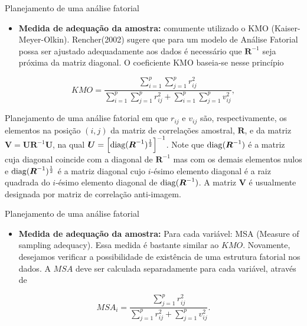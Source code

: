 \documentclass[
  ignorenonframetext,
  aspectratio=169,
]{beamer}
\providecommand{\tightlist}{%
  \setlength{\itemsep}{0pt}\setlength{\parskip}{0pt}}
\begin{document}
\begin{frame}{Planejamento de uma análise fatorial}
\label{planejamento-de-uma-anuxe1lise-fatorial-6}
\begin{itemize}
\tightlist
\item
  \textbf{Medida de adequação da amostra:} comumente utilizado o KMO
  (Kaiser-Meyer-Olkin). Rencher(2002) sugere que para um modelo de
  Análise Fatorial possa ser ajustado adequadamente aos dados é
  necessário que \(\boldsymbol{R}^{-1}\) seja próxima da matriz
  diagonal. O coeficiente KMO baseia-se nesse princípio
\end{itemize}

\[KMO = \dfrac{\displaystyle{\sum_{i=1}^p}\displaystyle{\sum_{j=1}^p} r^2_{ij}}{\displaystyle{\sum_{i=1}^p}\displaystyle{\sum_{j=1}^p} r_{ij}^2 + \displaystyle{\sum_{i=1}^p}\displaystyle{\sum_{j=1}^p}v_{ij}^2},\]
\end{frame}

\begin{frame}{Planejamento de uma análise fatorial}
\label{planejamento-de-uma-anuxe1lise-fatorial-7}
em que \(r_{ij}\) e \(v_{ij}\) são, respectivamente, os elementos na
posição \((i,j)\) da matriz de correlações amostral, \(\boldsymbol{R}\),
e da matriz
\(\boldsymbol{V} = \boldsymbol{U} \boldsymbol{R}^{-1} \boldsymbol{U}\),
na qual
\(\boldsymbol{U} = \left[{\rm diag} (\boldsymbol{R}^{-1})^{\frac{1}{2}}\right]^{-1}\).
Note que \({\rm diag}(\boldsymbol{R}^{-1})\) é a matriz cuja diagonal
coincide com a diagonal de \(\boldsymbol{R}^{-1}\) mas com os demais
elementos nulos e \({\rm diag}(\boldsymbol{R}^{-1})^{\frac{1}{2}}\) é a
matriz diagonal cujo \(i\)-ésimo elemento diagonal é a raiz quadrada do
\(i\)-ésimo elemento diagonal de \({\rm diag}(\boldsymbol{R}^{-1})\). A
matriz \(\boldsymbol{V}\) é usualmente designada por matriz de
correlação anti-imagem.
\end{frame}

\begin{frame}{Planejamento de uma análise fatorial}
\label{planejamento-de-uma-anuxe1lise-fatorial-8}
\begin{itemize}
\tightlist
\item
  \textbf{Medida de adequação da amostra:} Para cada variável: MSA
  (Measure of sampling adequacy). Essa medida é bastante similar ao
  \(KMO\). Novamente, desejamos verificar a possibilidade de existência
  de uma estrutura fatorial nos dados. A \(MSA\) deve ser calculada
  separadamente para cada variável, através de
\end{itemize}

\[MSA_i = \dfrac{\displaystyle{\sum_{j=1}^p} r^2_{ij}}{\displaystyle{\sum_{j=1}^p} r_{ij}^2 + \displaystyle{\sum_{j=1}^p}v_{ij}^2}.\]
\end{frame}
\end{document}
